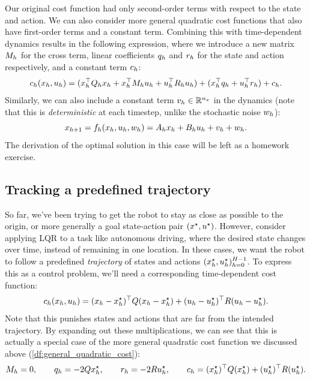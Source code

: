 \documentclass[../main/main]{subfiles}
\begin{document}
Our original cost function had only second-order terms with respect to the state and action. We can also consider more general quadratic cost functions that also have first-order terms and a constant term. Combining this with
time-dependent dynamics results in the following expression, where we introduce a new matrix $M_h$ for the cross term, linear coefficients $q_h$ and $r_h$ for the state and action respectively, and a constant term $c_h$:
\begin{equation}
    c_h(x_h, u_h) = ( x_h^\top Q_h x_h + x_h^\top M_h u_h + u_h^\top R_h u_h ) + (x_h^\top q_h + u_h^\top r_h) + c_h.
    \label{df:general_quadratic_cost}
\end{equation}
Similarly, we can also include a constant term $v_h \in \mathbb{R}^{n_x}$ in the dynamics (note that this is \emph{deterministic} at each timestep, unlike the stochastic noise $w_h$):
\[
    x_{h+1} = f_h(x_h, u_h, w_h) = A_h x_h + B_h u_h + v_h + w_h.
\]
The derivation of the optimal solution in this case will be left as a homework exercise.


\subsection{Tracking a predefined trajectory}

So far, we've been trying to get the robot to stay as close as possible to the origin, or more generally a goal state-action pair $(x^\star, u^\star)$.
However, consider applying LQR to a task like autonomous driving, where the desired state changes over time, instead of remaining in one location.
In these cases, we want the robot to follow a predefined \emph{trajectory} of
states and actions $(x_h^\star, u_h^\star)_{h=0}^{H-1}$. To express this as a control problem, we'll need a corresponding time-dependent cost function:
\[
    c_h(x_h, u_h) = (x_h - x^\star_h)^\top Q (x_h - x^\star_h) + (u_h - u^\star_h)^\top R (u_h - u^\star_h).
\]
Note that this punishes states and actions that are far from the intended trajectory. By expanding out these multiplications, we can see that this is actually a special case of the more general quadratic cost function we discussed above (\autoref{df:general_quadratic_cost}): \[
    M_h = 0, \qquad q_h = -2Q x^\star_h, \qquad r_h = -2R u^\star_h, \qquad c_h = (x^\star_h)^\top Q (x^\star_h) + (u^\star_h)^\top R (u^\star_h).
\]
\end{document}
